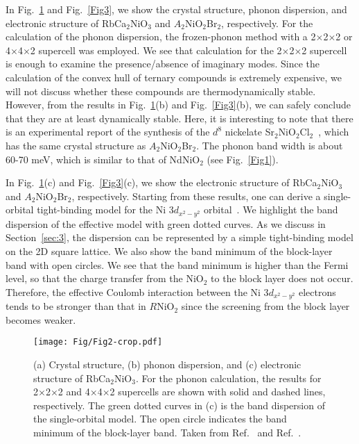 \documentclass[%
 aip,
 amsmath,amssymb,
 reprint,%
]{revtex4-1}
\begin{document}
In Fig.~\ref{Fig2} and Fig.~\ref{Fig3}, we show the crystal structure, phonon dispersion, and electronic structure of RbCa$_2$NiO$_3$ and $A_2$NiO$_2$Br$_2$, respectively. For the calculation of the phonon dispersion, the frozen-phonon method with a 2$\times$2$\times$2 or 4$\times$4$\times$2 supercell was employed. We see that calculation for the 2$\times$2$\times$2 supercell is enough to examine the presence/absence of imaginary modes. Since the calculation of the convex hull of ternary compounds is extremely expensive, we will not discuss whether these compounds are thermodynamically stable. However, from the results in Fig.~\ref{Fig2}(b) and Fig.~\ref{Fig3}(b), we can safely conclude that they are at least dynamically stable. Here, it is interesting to note that there is an experimental report of the synthesis of the $d^8$ nickelate Sr$_2$NiO$_2$Cl$_2$~\cite{Tsujimoto_2014}, which has the same crystal structure as $A_2$NiO$_2$Br$_2$. The phonon band width is about 60-70 meV, which is similar to that of NdNiO$_2$ (see Fig.~\ref{Fig1}).

In Fig.~\ref{Fig2}(c) and Fig.~\ref{Fig3}(c), we show the electronic structure of RbCa$_2$NiO$_3$ and $A_2$NiO$_2$Br$_2$, respectively. Starting from these results, one can derive a single-orbital tight-binding model for the Ni 3$d_{x^2-y^2}$ orbital~\cite{Hirayama_2020}. We highlight the band dispersion of the effective model with green dotted curves. As we discuss in Section~\ref{sec:3}, the dispersion can be represented by a simple tight-binding model on the 2D square lattice. We also show the band minimum of the block-layer band with open circles. We see that the band minimum is higher than the Fermi level, so that the charge transfer from the NiO$_2$ to the block layer does not occur. Therefore, the effective Coulomb interaction between the Ni 3$d_{x^2-y^2}$ electrons tends to be stronger than that in $R$NiO$_2$ since the screening from the block layer becomes weaker.

\begin{figure}
\texttt{[image: Fig/Fig2-crop.pdf]}
\caption{(a) Crystal structure, (b) phonon dispersion, and (c) electronic structure of RbCa$_2$NiO$_3$. For the phonon calculation, the results for 2$\times$2$\times$2 and 4$\times$4$\times$2 supercells are shown with solid and dashed lines, respectively. The green dotted curves in (c) is the band dispersion of the single-orbital model. The open circle indicates the band minimum of the block-layer band. Taken from Ref.~ and Ref.~.}
\label{Fig2}
\end{figure}
\end{document}
